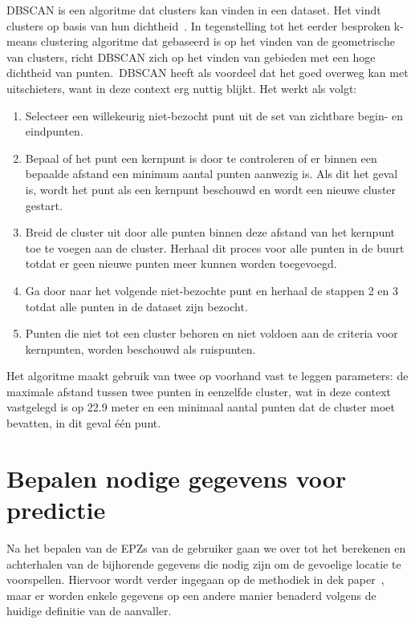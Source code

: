 \ac{DBSCAN} is een algoritme dat clusters kan vinden in een dataset. Het vindt
clusters op basis van hun dichtheid~\cite{KMeansvs80:online}. In tegenstelling tot het eerder besproken
k-means clustering algoritme dat gebaseerd is
op het vinden van de geometrische van clusters, richt \ac{DBSCAN}
zich op het vinden van gebieden met een hoge dichtheid van punten.\ \ac{DBSCAN}
heeft als voordeel dat het goed overweg kan met uitschieters, want in deze
context erg nuttig blijkt. Het werkt als volgt:
\begin{enumerate}
    \item Selecteer een willekeurig niet-bezocht punt uit de set van zichtbare begin- en
          eindpunten.
    \item Bepaal of het punt een kernpunt is door te controleren of er binnen een
          bepaalde afstand een minimum aantal punten aanwezig is. Als dit het geval is,
          wordt het punt als een kernpunt beschouwd en wordt een nieuwe cluster gestart.
    \item Breid de cluster uit door alle punten binnen deze afstand van het kernpunt toe
          te voegen aan de cluster. Herhaal dit proces voor alle punten in de buurt
          totdat er geen nieuwe punten meer kunnen worden toegevoegd.
    \item Ga door naar het volgende niet-bezochte punt en herhaal de stappen 2 en 3
          totdat alle punten in de dataset zijn bezocht.
    \item Punten die niet tot een cluster behoren en niet voldoen aan de criteria voor
          kernpunten, worden beschouwd als ruispunten.
\end{enumerate}
Het algoritme maakt gebruik van twee op voorhand vast te leggen parameters: de maximale afstand tussen twee
punten in eenzelfde cluster, wat in deze context vastgelegd is op 22.9 meter en
een minimaal aantal punten dat de cluster moet bevatten, in dit geval één punt.

\section{Bepalen nodige gegevens voor predictie}
Na het bepalen van de \acp{EPZ} van de gebruiker gaan we over tot het berekenen
en achterhalen van de bijhorende gegevens die nodig zijn om de gevoelige
locatie te voorspellen. Hiervoor wordt verder ingegaan op de methodiek in dek
paper~\citeauthor{Dhondt}, maar er worden enkele gegevens op een andere manier
benaderd volgens de huidige definitie van de aanvaller.

